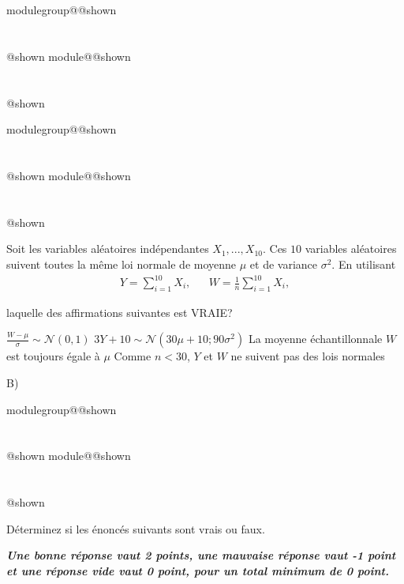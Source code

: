 \documentclass{Evaluation}
\makeatletter
\newcommand{\currentmodulekey}{}
\newcommand{\currentmoduletitle}{}
\newcommand{\currentgroupkey}{}
\newcommand{\currentgrouptitle}{}
\newcommand{\showmoduleifneeded}{%
  \ifx\currentgroupkey\empty\else
    \expandafter\ifx\csname modulegroup@\currentgroupkey @shown\endcsname\relax
      \section*{\currentgrouptitle}%
      \expandafter\gdef\csname modulegroup@\currentgroupkey @shown\endcsname{1}%
    \fi
  \fi
  \expandafter\ifx\csname module@\currentmodulekey @shown\endcsname\relax
    \section*{\currentmoduletitle}%
    \expandafter\gdef\csname module@\currentmodulekey @shown\endcsname{1}%
  \fi
}
\newenvironment{A22}{\showmoduleifneeded}{}
\newenvironment{H23}{\showmoduleifneeded}{}
\newenvironment{H26}{\showmoduleifneeded}{}
\makeatother
\begin{document}
\begin{questions}
\begin{H26}
\begin{parts}
        \end{parts}
\end{H26}

\begin{A22}
\question {} %

Soit les variables aléatoires indépendantes $X_1,...,X_{10}$. Ces $10$ variables aléatoires suivent toutes la même loi normale de moyenne $\mu$ et de variance $\sigma^2$. En utilisant
\begin{align*}
    Y=\displaystyle \sum_{i=1}^{10} X_i, & & W=\displaystyle \frac{1}{n}\sum_{i=1}^{10} X_i,
\end{align*}

laquelle des affirmations suivantes est VRAIE?

\begin{checkboxes}
\choice $\frac{W-\mu}{\sigma}\sim\mathcal{N}(0,1)$
\CorrectChoice $3Y+10\sim \mathcal{N}(30\mu + 10; 90\sigma^2)$
\choice La moyenne échantillonnale $W$ est toujours égale à $\mu$
\choice Comme $n<30$, $Y$ et $W$ ne suivent pas des lois normales
\end{checkboxes}

\begin{solution}
    B)
\end{solution}

\end{A22}

\begin{H23}
\question {} %
Déterminez si les énoncés suivants sont vrais ou faux.

\textbf{\textit{Une bonne réponse vaut 2 points, une mauvaise réponse vaut -1 point et une réponse vide vaut 0 point, pour un total minimum de 0 point.}}

\end{H23}
\end{questions}
\end{document}

